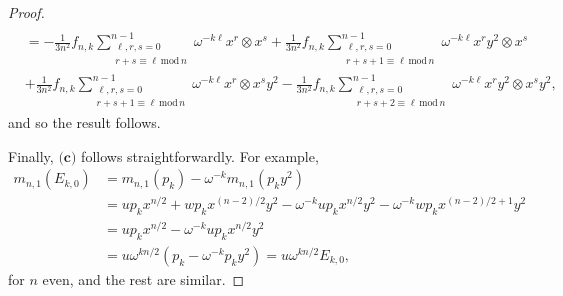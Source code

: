 \documentclass[a4paper,11pt]{amsart}
\begin{document}
\begin{proof}
\begin{align*}
\\
&=-\frac{1}{3n^2}f_{n,k}\sum_{\substack{\ell, r, s = 0 \\ r+s\equiv \ell \, \text{mod} \, n}}^{n-1} \omega^{-k\ell}x^{r} \otimes x^s  +\frac{1}{3n^2}f_{n,k}\sum_{\substack{\ell, r, s = 0 \\ r+s +1 \equiv \ell \, \text{mod} \, n}}^{n-1} \omega^{-k\ell}x^{r}y^2 \otimes x^s  \\
&+ \frac{1}{3n^2}f_{n,k}\sum_{\substack{\ell, r, s = 0 \\ r+s+1 \equiv \ell \, \text{mod} \, n}}^{n-1} \omega^{-k\ell} x^{r} \otimes x^sy^2 - \frac{1}{3n^2}f_{n,k}\sum_{\substack{\ell, r, s = 0 \\ r+s+2 \equiv \ell \, \text{mod} \, n}}^{n-1} \omega^{-k\ell}x^{r}y^2 \otimes x^sy^2,
\end{align*}
and so the result follows.

Finally, $\textbf{(c)}$ follows straightforwardly. For example, 
\begin{align*}
m_{n, 1}(E_{k,0})&=m_{n, 1}(p_k) - \omega^{-k}m_{n,1}(p_ky^2) \\
&=u p_k x^{n/2} + w p_k x^{(n-2)/2}y^2 - \omega^{-k}u p_k x^{n/2}y^2 - \omega^{-k}w p_k x^{(n-2)/2+1}y^2 \\
&= u p_k x^{n/2}- \omega^{-k}u p_k x^{n/2}y^2 
\\
& = u\omega^{kn/2}(p_k - \omega^{-k}p_ky^2) = u\omega^{kn/2} E_{k,0},
\end{align*}
for $n$ even, and the rest are similar.
\end{proof}
\end{document}
